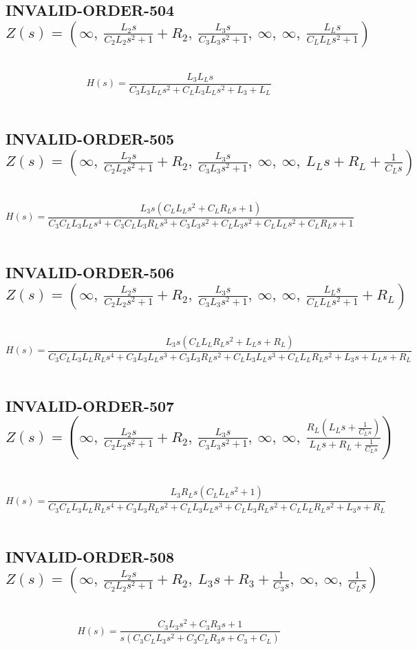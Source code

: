\documentclass{article}
\begin{document}
\subsection{INVALID-ORDER-504 $Z(s) = \left( \infty, \  \frac{L_{2} s}{C_{2} L_{2} s^{2} + 1} + R_{2}, \  \frac{L_{3} s}{C_{3} L_{3} s^{2} + 1}, \  \infty, \  \infty, \  \frac{L_{L} s}{C_{L} L_{L} s^{2} + 1}\right)$ } \ 
\textbf{\[H(s) = \frac{L_{3} L_{L} s}{C_{3} L_{3} L_{L} s^{2} + C_{L} L_{3} L_{L} s^{2} + L_{3} + L_{L}}\] } \ 
\subsection{INVALID-ORDER-505 $Z(s) = \left( \infty, \  \frac{L_{2} s}{C_{2} L_{2} s^{2} + 1} + R_{2}, \  \frac{L_{3} s}{C_{3} L_{3} s^{2} + 1}, \  \infty, \  \infty, \  L_{L} s + R_{L} + \frac{1}{C_{L} s}\right)$ } \ 
\textbf{\[H(s) = \frac{L_{3} s \left(C_{L} L_{L} s^{2} + C_{L} R_{L} s + 1\right)}{C_{3} C_{L} L_{3} L_{L} s^{4} + C_{3} C_{L} L_{3} R_{L} s^{3} + C_{3} L_{3} s^{2} + C_{L} L_{3} s^{2} + C_{L} L_{L} s^{2} + C_{L} R_{L} s + 1}\] } \ 
\subsection{INVALID-ORDER-506 $Z(s) = \left( \infty, \  \frac{L_{2} s}{C_{2} L_{2} s^{2} + 1} + R_{2}, \  \frac{L_{3} s}{C_{3} L_{3} s^{2} + 1}, \  \infty, \  \infty, \  \frac{L_{L} s}{C_{L} L_{L} s^{2} + 1} + R_{L}\right)$ } \ 
\textbf{\[H(s) = \frac{L_{3} s \left(C_{L} L_{L} R_{L} s^{2} + L_{L} s + R_{L}\right)}{C_{3} C_{L} L_{3} L_{L} R_{L} s^{4} + C_{3} L_{3} L_{L} s^{3} + C_{3} L_{3} R_{L} s^{2} + C_{L} L_{3} L_{L} s^{3} + C_{L} L_{L} R_{L} s^{2} + L_{3} s + L_{L} s + R_{L}}\] } \ 
\subsection{INVALID-ORDER-507 $Z(s) = \left( \infty, \  \frac{L_{2} s}{C_{2} L_{2} s^{2} + 1} + R_{2}, \  \frac{L_{3} s}{C_{3} L_{3} s^{2} + 1}, \  \infty, \  \infty, \  \frac{R_{L} \left(L_{L} s + \frac{1}{C_{L} s}\right)}{L_{L} s + R_{L} + \frac{1}{C_{L} s}}\right)$ } \ 
\textbf{\[H(s) = \frac{L_{3} R_{L} s \left(C_{L} L_{L} s^{2} + 1\right)}{C_{3} C_{L} L_{3} L_{L} R_{L} s^{4} + C_{3} L_{3} R_{L} s^{2} + C_{L} L_{3} L_{L} s^{3} + C_{L} L_{3} R_{L} s^{2} + C_{L} L_{L} R_{L} s^{2} + L_{3} s + R_{L}}\] } \ 
\subsection{INVALID-ORDER-508 $Z(s) = \left( \infty, \  \frac{L_{2} s}{C_{2} L_{2} s^{2} + 1} + R_{2}, \  L_{3} s + R_{3} + \frac{1}{C_{3} s}, \  \infty, \  \infty, \  \frac{1}{C_{L} s}\right)$ } \ 
\textbf{\[H(s) = \frac{C_{3} L_{3} s^{2} + C_{3} R_{3} s + 1}{s \left(C_{3} C_{L} L_{3} s^{2} + C_{3} C_{L} R_{3} s + C_{3} + C_{L}\right)}\] } \ 
\end{document}
